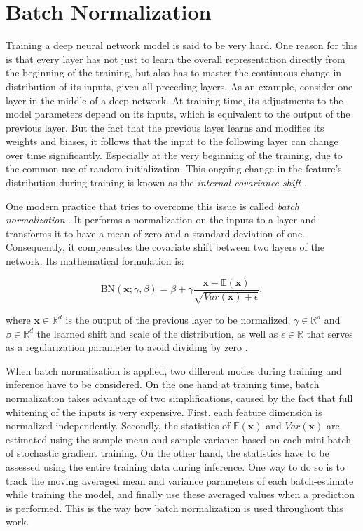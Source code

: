 \section{Batch Normalization} \label{sec:batch_norm}

Training a deep neural network model is said to be very hard. One reason for this is that every layer has not just to learn the overall representation directly from the beginning of the training, but also has to master the continuous change in distribution of its inputs, given all preceding layers. As an example, consider one layer in the middle of a deep network. At training time, its adjustments to the model parameters depend on its inputs, which is equivalent to the output of the previous layer. But the fact that the previous layer learns and modifies its weights and biases, it follows that the input to the following layer can change over time significantly. Especially at the very beginning of the training, due to the common use of random initialization. This ongoing change in the feature's distribution during training is known as the \textit{internal covariance shift} \parencite{rnn-batchnorm}.

One modern practice that tries to overcome this issue is called \textit{batch normalization} \parencite{batchnorm}. It performs a normalization on the inputs to a layer and transforms it to have a mean of zero and a standard deviation of one. Consequently, it compensates the covariate shift between two layers of the network. Its mathematical formulation is:

\begin{equation} \label{eq:bn}
\textrm{BN}(\textbf{x}; \gamma, \beta) = \beta + \gamma \frac{\textbf{x} - \mathbb{E}(\textbf{x})}{\sqrt{Var(\textbf{x}) + \epsilon}} ,
\end{equation}

where $ \textbf{x} \in \mathbb{R}^d $ is the output of the previous layer to be normalized, $\gamma \in \mathbb{R}^d $ and $\beta \in \mathbb{R}^d $ the learned shift and scale of the distribution, as well as $\epsilon \in \mathbb{R} $ that serves as a regularization parameter to avoid dividing by zero \parencite{rnn-batchnorm}.

When batch normalization is applied, two different modes during training and inference have to be considered. On the one hand at training time, batch normalization takes advantage of two simplifications, caused by the fact that full whitening of the inputs is very expensive. First, each feature dimension is normalized independently. Secondly, the statistics of $ \mathbb{E}(\textbf{x}) $ and $ Var(\textbf{x}) $ are estimated using the sample mean and sample variance based on each mini-batch of stochastic gradient training. On the other hand, the statistics have to be assessed using the entire training data during inference. One way to do so is to track the moving averaged mean and variance parameters of each batch-estimate while training the model, and finally use these averaged values when a prediction is performed. This is the way how batch normalization is used throughout this work.

